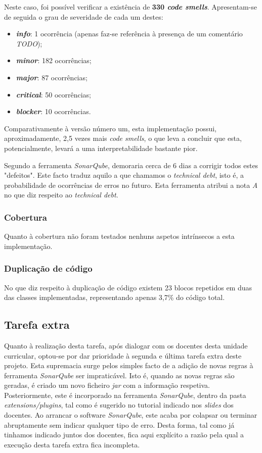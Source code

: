 \documentclass[a4paper]{report}
\begin{document}
Neste caso, foi possível verificar a existência de \textbf{330 \textit{code smells}}. Apresentam-se de seguida o grau de severidade de cada um destes:
\begin{itemize}
    \item \textbf{\textit{info}}: 1 ocorrência (apenas faz-se referência à presença de um comentário \textit{TODO});
    \item \textbf{\textit{minor}}: 182 ocorrências;
    \item \textbf{\textit{major}}: 87 ocorrências;
    \item \textbf{\textit{critical}}: 50 ocorrências;
    \item \textbf{\textit{blocker}}: 10 ocorrências.
\end{itemize}

Comparativamente à versão número um, esta implementação possui, aproximadamente, 2,5 vezes mais \textit{code smells}, o que leva a concluir que esta, potencialmente, levará a uma interpretabilidade bastante pior.

Segundo a ferramenta \textit{SonarQube}, demoraria cerca de 6 dias a corrigir todos estes "defeitos". Este facto traduz aquilo a que chamamos o \textit{technical debt}, isto é, a probabilidade de ocorrências de erros no futuro. Esta ferramenta atribui a nota \textit{A} no que diz respeito ao \textit{technical debt}.

\subsubsection{Cobertura}
Quanto à cobertura não foram testados nenhuns aspetos intrínsecos a esta implementação.

\subsubsection{Duplicação de código}
No que diz respeito à duplicação de código existem 23 blocos repetidos em duas das classes implementadas, representando apenas 3,7\% do código total.

\subsection{Tarefa extra}
Quanto à realização desta tarefa, após dialogar com os docentes desta unidade curricular, optou-se por dar prioridade à segunda e última tarefa extra deste projeto. 
Esta supremacia surge pelos simples facto de a adição de novas regras à ferramenta \textit{SonarQube} ser impraticável. Isto é, quando as novas regras são geradas, é criado um novo ficheiro \textit{jar} com a informação respetiva. Posteriormente, este é incorporado na ferramenta \textit{SonarQube}, dentro da pasta \textit{extensions/plugins}, tal como é sugerido no tutorial indicado nos \textit{slides} dos docentes.
Ao arrancar o software \textit{SonarQube}, este acaba por colapsar ou terminar abruptamente sem indicar qualquer tipo de erro. Desta forma, tal como já tinhamos indicado juntos dos docentes, fica aqui explícito a razão pela qual a execução desta tarefa extra fica incompleta.
\end{document}
